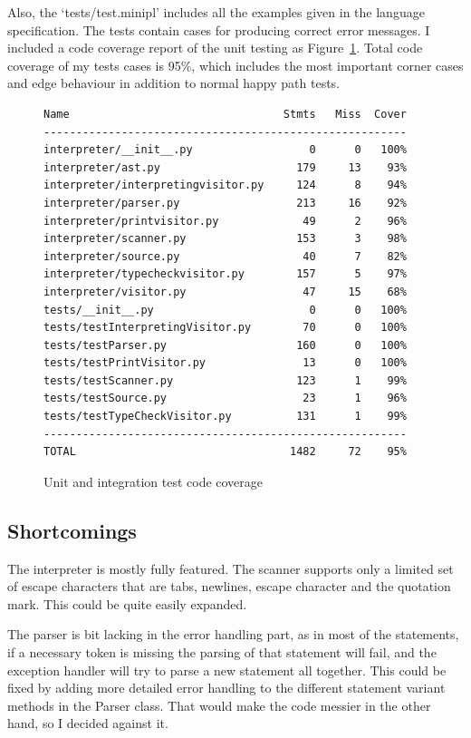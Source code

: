 \documentclass[12pt,a4paper]{article}
\begin{document}
Also, the `tests/test.minipl' includes all the examples given
in the language specification.
The tests contain cases for producing correct error messages.
I included a code coverage report of the unit testing as
Figure~\ref{codecov}. Total code coverage of my tests cases
is 95\%, which includes the most important corner cases
and edge behaviour in addition to normal happy path tests.


\begin{figure}\label{codecov}
  \caption{Unit and integration test code coverage}
  \begin{verbatim}
Name                                 Stmts   Miss  Cover
--------------------------------------------------------
interpreter/__init__.py                  0      0   100%
interpreter/ast.py                     179     13    93%
interpreter/interpretingvisitor.py     124      8    94%
interpreter/parser.py                  213     16    92%
interpreter/printvisitor.py             49      2    96%
interpreter/scanner.py                 153      3    98%
interpreter/source.py                   40      7    82%
interpreter/typecheckvisitor.py        157      5    97%
interpreter/visitor.py                  47     15    68%
tests/__init__.py                        0      0   100%
tests/testInterpretingVisitor.py        70      0   100%
tests/testParser.py                    160      0   100%
tests/testPrintVisitor.py               13      0   100%
tests/testScanner.py                   123      1    99%
tests/testSource.py                     23      1    96%
tests/testTypeCheckVisitor.py          131      1    99%
--------------------------------------------------------
TOTAL                                 1482     72    95%
  \end{verbatim}
\end{figure}

\subsection{Shortcomings}

The interpreter is mostly fully featured. 
The scanner supports only a limited set of escape characters that are
tabs, newlines, escape character and the quotation mark. This could
be quite easily expanded. 

The parser is bit lacking
in the error handling part, as in most of the statements, if a 
necessary token is missing the parsing of that statement will fail,
and the exception handler will try to parse a new statement all together.
This could be fixed by adding more detailed error handling to the
different statement variant methods in the Parser class. That would
make the code messier in the other hand, so I decided against it.
\end{document}
